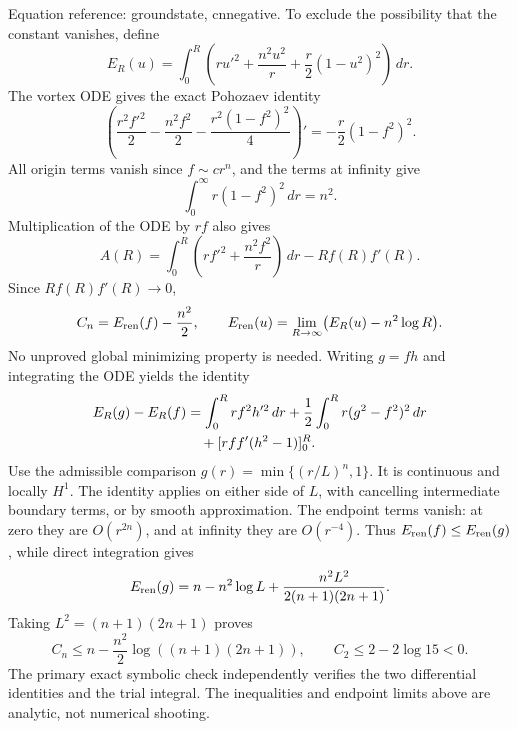 \documentclass[10pt]{article}
\begin{document}
Equation reference: groundstate, cnnegative. To exclude the possibility that the constant vanishes, define \[E_R(u)=\int_0^R
 \left(ru'^2+\frac{n^2u^2}{r}+\frac r2(1-u^2)^2\right)\,dr.\] The vortex ODE gives the exact Pohozaev identity \[\left(\frac{r^2f'^2}{2}-\frac{n^2f^2}{2}
                -\frac{r^2(1-f^2)^2}{4}\right)'
       =-\frac r2(1-f^2)^2.\] All origin terms vanish since \(f\sim c r^n\), and the terms at infinity give \[\int_0^\infty r(1-f^2)^2\,dr=n^2.\] Multiplication of the ODE by \(rf\) also gives \[A(R)=\int_0^R\left(rf'^2+\frac{n^2f^2}{r}\right)\,dr-Rf(R)f'(R).\] Since \(Rf(R)f'(R)\to0\), \[C_n=E_{\rm ren}(f)-\frac{n^2}{2},\qquad
 E_{\rm ren}(u)=\lim_{R\to\infty}\bigl(E_R(u)-n^2\log R\bigr).\] No unproved global minimizing property is needed. Writing \(g=fh\) and integrating the ODE yields the identity \[\begin{aligned}
 E_R(g)-E_R(f)
 &=\int_0^R r f^2 h'^2\,dr
   +\frac12\int_0^R r(g^2-f^2)^2\,dr \notag\\
 &\quad+[rff'(h^2-1)]_0^R. \end{aligned}\] Use the admissible comparison \(g(r)=\min\{(r/L)^n,1\}\). It is continuous and locally \(H^1\). The identity applies on either side of \(L\), with cancelling intermediate boundary terms, or by smooth approximation. The endpoint terms vanish: at zero they are \(O(r^{2n})\), and at infinity they are \(O(r^{-4})\). Thus \(E_{\rm ren}(f)\le E_{\rm ren}(g)\), while direct integration gives \[E_{\rm ren}(g)=n-n^2\log L+
                \frac{n^2L^2}{2(n+1)(2n+1)}.\] Taking \(L^2=(n+1)(2n+1)\) proves \[
 C_n\le n-\frac{n^2}{2}\log((n+1)(2n+1)),\qquad
 C_2\le2-2\log15<0.\] The primary exact symbolic check independently verifies the two differential identities and the trial integral. The inequalities and endpoint limits above are analytic, not numerical shooting.\par
\end{document}
